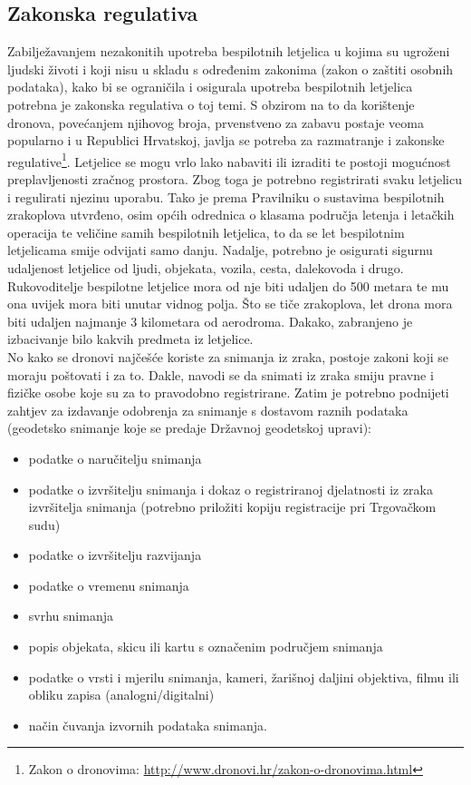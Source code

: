 \documentclass[times, utf8, diplomski]{fer}
\begin{document}
\subsection{Zakonska regulativa\citep{Ekscentar}} 
Zabilježavanjem nezakonitih upotreba bespilotnih letjelica u kojima su ugroženi ljudski životi i koji nisu u skladu s određenim zakonima (zakon o zaštiti osobnih podataka), kako bi se ograničila i osigurala upotreba bespilotnih letjelica potrebna je zakonska regulativa o toj temi. S obzirom na to da korištenje dronova, povećanjem njihovog broja, prvenstveno za zabavu postaje veoma popularno i u Republici Hrvatskoj, javlja se potreba za razmatranje i zakonske regulative\footnote{Zakon o dronovima: \url{http://www.dronovi.hr/zakon-o-dronovima.html}}.  Letjelice  se  mogu  vrlo  lako  nabaviti  ili  izraditi  te  postoji mogućnost preplavljenosti zračnog prostora. Zbog toga je potrebno registrirati svaku letjelicu i regulirati njezinu uporabu. Tako je prema Pravilniku o sustavima bespilotnih zrakoplova utvrđeno, osim općih odrednica o klasama područja letenja i letačkih operacija te veličine samih bespilotnih letjelica, to da se let bespilotnim letjelicama smije odvijati samo danju. Nadalje, potrebno je osigurati sigurnu udaljenost letjelice od ljudi, objekata, vozila, cesta, dalekovoda i drugo. Rukovoditelje bespilotne letjelice mora od nje biti udaljen do 500 metara te mu ona uvijek mora biti unutar vidnog polja. Što se tiče zrakoplova, let  drona  mora  biti  udaljen  najmanje  3  kilometara  od  aerodroma.  Dakako,  zabranjeno  je izbacivanje bilo kakvih predmeta iz letjelice. \\
No kako se dronovi najčešće koriste za snimanja iz zraka, postoje zakoni koji se moraju poštovati i za to. Dakle, navodi se da snimati iz zraka smiju pravne i fizičke osobe koje su za to pravodobno registrirane. Zatim je potrebno podnijeti zahtjev za izdavanje odobrenja za snimanje s dostavom  raznih  podataka (geodetsko snimanje koje se predaje Državnoj geodetskoj upravi):
\begin{itemize}
\item podatke o naručitelju snimanja
\item podatke o izvršitelju snimanja i dokaz o registriranoj djelatnosti iz zraka izvršitelja snimanja (potrebno priložiti kopiju registracije pri Trgovačkom sudu)
\item podatke o izvršitelju razvijanja
\item podatke o vremenu snimanja
\item svrhu snimanja
\item popis objekata, skicu ili kartu s označenim područjem snimanja
\item podatke o vrsti i mjerilu snimanja, kameri, žarišnoj daljini objektiva, filmu ili obliku zapisa (analogni/digitalni)
\item način čuvanja izvornih podataka snimanja.
\end{itemize}
\end{document}

